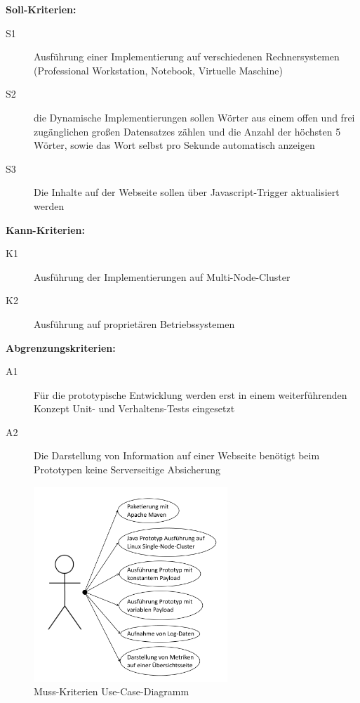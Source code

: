 \textbf{Soll-Kriterien:}
\begin{description}
  \item[S1] Ausführung einer Implementierung auf verschiedenen Rechnersystemen (Professional Workstation, Notebook, Virtuelle Maschine)
	\item[S2] die Dynamische Implementierungen sollen Wörter aus einem offen und frei zugänglichen großen Datensatzes zählen und die Anzahl der höchsten 5 Wörter, sowie das Wort selbst pro Sekunde automatisch anzeigen
	\item[S3] Die Inhalte auf der Webseite sollen über Javascript-Trigger aktualisiert werden
\end{description}

\textbf{Kann-Kriterien:}
\begin{description}
  \item[K1] Ausführung der Implementierungen auf Multi-Node-Cluster
	\item[K2] Ausführung auf proprietären Betriebssystemen
\end{description}

\textbf{Abgrenzungskriterien:}
\begin{description}
  \item[A1] Für die prototypische Entwicklung werden erst in einem weiterführenden Konzept Unit- und Verhaltens-Tests eingesetzt
	\item[A2] Die Darstellung von Information auf einer Webseite benötigt beim Prototypen keine Serverseitige Absicherung
\end{description}


\begin{figure}[htb!]
\centering
\includegraphics[width=0.65\textwidth]{bilder/useCaseMussKriterien.png}
\caption{Muss-Kriterien Use-Case-Diagramm
\label{fig:useCaseMussKriterien}}
\end{figure}

